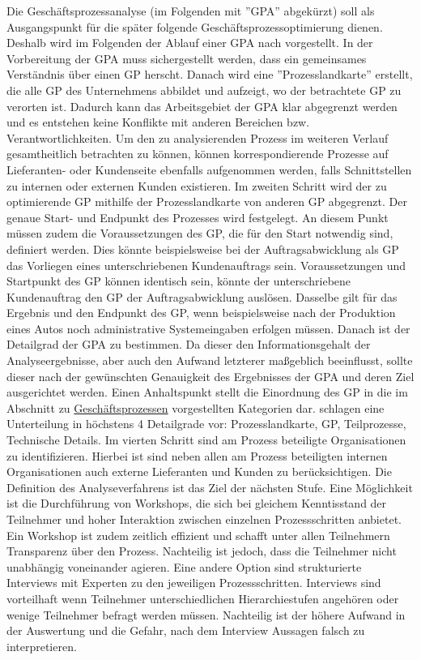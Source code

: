 Die Geschäftsprozessanalyse (im Folgenden mit ''GPA'' abgekürzt) soll als Ausgangspunkt für die später folgende Geschäftsprozessoptimierung dienen. Deshalb wird im Folgenden der Ablauf einer GPA nach \cite[][S. 63ff]{theorie_best_geschaftsprozesse_optimieren_2009} vorgestellt.
In der Vorbereitung der GPA muss sichergestellt werden, dass ein gemeinsames Verständnis über einen GP herscht. Danach wird eine ''Prozesslandkarte'' erstellt, die alle GP des Unternehmens abbildet und aufzeigt, wo der betrachtete GP zu verorten ist. Dadurch kann das Arbeitsgebiet der GPA klar abgegrenzt werden und es entstehen keine Konflikte mit anderen Bereichen bzw. Verantwortlichkeiten. Um den zu analysierenden Prozess im weiteren Verlauf gesamtheitlich betrachten zu können, können korrespondierende Prozesse auf Lieferanten- oder Kundenseite ebenfalls aufgenommen werden, falls Schnittstellen zu internen oder externen Kunden existieren. 
Im zweiten Schritt wird der zu optimierende GP mithilfe der Prozesslandkarte von anderen GP abgegrenzt. Der genaue Start- und Endpunkt des Prozesses wird festgelegt. An diesem Punkt müssen zudem die Voraussetzungen des GP, die für den Start notwendig sind, definiert werden. Dies könnte beispielsweise bei der Auftragsabwicklung als GP das Vorliegen eines unterschriebenen Kundenauftrags sein. Voraussetzungen und Startpunkt des GP können identisch sein, \zB könnte der unterschriebene Kundenauftrag den GP der Auftragsabwicklung auslösen. Dasselbe gilt für das Ergebnis und den Endpunkt des GP, wenn beispielsweise nach der Produktion eines Autos noch administrative Systemeingaben erfolgen müssen.
Danach ist der Detailgrad der GPA zu bestimmen. Da dieser den Informationsgehalt der Analyseergebnisse, aber auch den Aufwand letzterer maßgeblich beeinflusst, sollte dieser nach der gewünschten Genauigkeit des Ergebnisses der GPA und deren Ziel ausgerichtet werden. Einen Anhaltspunkt stellt die Einordnung des GP in die im Abschnitt zu \hyperref[sec:Kapitel211]{Geschäftsprozessen} vorgestellten Kategorien dar. \cite{theorie_best_geschaftsprozesse_optimieren_2009} schlagen eine Unterteilung in höchstens 4 Detailgrade vor: Prozesslandkarte, GP, Teilprozesse, Technische Details.
Im vierten Schritt sind am Prozess beteiligte Organisationen zu identifizieren. Hierbei ist sind neben allen am Prozess beteiligten internen Organisationen auch externe Lieferanten und Kunden zu berücksichtigen.
Die Definition des Analyseverfahrens ist das Ziel der nächsten Stufe. Eine Möglichkeit ist die Durchführung von Workshops, die sich bei gleichem Kenntisstand der Teilnehmer und hoher Interaktion zwischen einzelnen Prozessschritten anbietet. Ein Workshop ist zudem zeitlich effizient und schafft unter allen Teilnehmern Transparenz über den Prozess. Nachteilig ist jedoch, dass die Teilnehmer nicht unabhängig voneinander agieren. Eine andere Option sind strukturierte Interviews mit Experten zu den jeweiligen Prozessschritten. Interviews sind vorteilhaft wenn Teilnehmer unterschiedlichen Hierarchiestufen angehören oder wenige Teilnehmer befragt werden müssen. Nachteilig ist der höhere Aufwand in der Auswertung und die Gefahr, nach dem Interview Aussagen falsch zu interpretieren.
